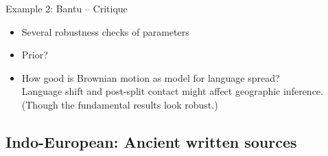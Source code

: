 \documentclass[9pt]{beamer}
\begin{document}
\begin{frame}{Example 2: Bantu – Critique}
  \begin{itemize}
  \item Several robustness checks of parameters
  \item Prior?
  \item How good is Brownian motion as model for language spread?\\
    Language shift and post-split contact might affect geographic
    inference. (Though the fundamental results look robust.)
  \end{itemize}
\end{frame}
\subsection{Indo-European: Ancient written sources}
\end{document}
